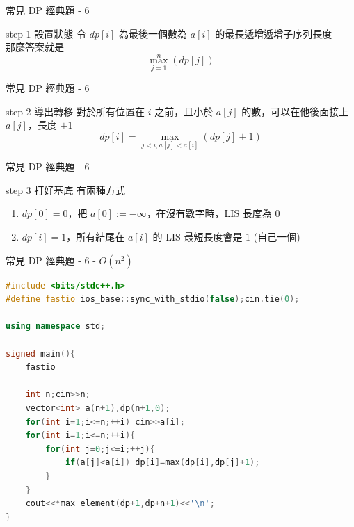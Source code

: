 \documentclass[aspectratio=169]{beamer}
\begin{document}
    \begin{frame}{常見 DP 經典題 - 6}
        \begin{alertblock}{step 1 設置狀態}
            令 $dp[i]$ 為最後一個數為 $a[i]$ 的最長遞增遞增子序列長度 \\
            \vspace{2mm}
            那麼答案就是 
            $$\max_{j=1}^n(dp[j])$$
        \end{alertblock}
    \end{frame}
    \begin{frame}{常見 DP 經典題 - 6}
        \begin{block}{step 2 導出轉移}
            對於所有位置在 $i$ 之前，且小於 $a[j]$ 的數，可以在他後面接上 $a[j]$，長度 $+1$ \\
            $$dp[i] = \max_{j < i, a[j] < a[i]}(dp[j]+1)$$
        \end{block}
    \end{frame}  
    \begin{frame}{常見 DP 經典題 - 6}
        \begin{block}{step 3 打好基底}
            有兩種方式
            \begin{enumerate}
                \item $dp[0]=0$，把 $a[0] := -\infty$，在沒有數字時，LIS 長度為 $0$
                \item $dp[i]=1$，所有結尾在 $a[i]$ 的 LIS 最短長度會是 $1$ (自己一個)
            \end{enumerate}
        \end{block}
    \end{frame}
    
    \begin{frame}[fragile]{常見 DP 經典題 - 6 - $O(n^2)$ }
        \begin{lstlisting}[language=C++, basicstyle=\ttfamily\tiny]
#include <bits/stdc++.h>
#define fastio ios_base::sync_with_stdio(false);cin.tie(0);

using namespace std;
 
signed main(){
    fastio
 
    int n;cin>>n;
    vector<int> a(n+1),dp(n+1,0);
    for(int i=1;i<=n;++i) cin>>a[i];
    for(int i=1;i<=n;++i){
        for(int j=0;j<=i;++j){
            if(a[j]<a[i]) dp[i]=max(dp[i],dp[j]+1);
        }
    }
    cout<<*max_element(dp+1,dp+n+1)<<'\n';
}
        \end{lstlisting}
    \end{frame}
    
\end{document}
